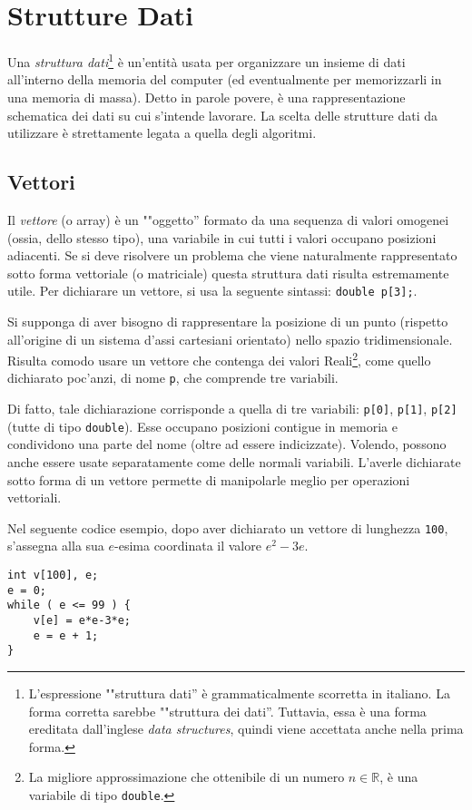 	\section{Strutture Dati}
Una \emph{struttura dati}\footnote{L'espressione ""struttura dati'' è grammaticalmente scorretta in italiano. La forma corretta sarebbe ""struttura dei dati''. Tuttavia, essa è una forma ereditata dall'inglese \emph{data structures}, quindi viene accettata anche nella prima forma.} è un'entità usata per organizzare un insieme di dati all'interno della memoria del computer (ed eventualmente per memorizzarli in una memoria di massa). Detto in parole povere, è una rappresentazione schematica dei dati su cui s'intende lavorare.
La scelta delle strutture dati da utilizzare è strettamente legata a quella degli algoritmi.

		\subsection{Vettori}
		\label{subsec:array}
Il \emph{vettore} (o array) è un ""oggetto'' formato da una sequenza di valori omogenei (ossia, dello stesso tipo), una variabile in cui tutti i valori occupano posizioni adiacenti. Se si deve risolvere un problema che viene naturalmente rappresentato sotto forma vettoriale (o matriciale) questa struttura dati risulta estremamente utile. Per dichiarare un vettore, si usa la seguente sintassi: \lstinline!double p[3];!.

Si supponga di aver bisogno di rappresentare la posizione di un punto (rispetto all'origine di un sistema d'assi cartesiani orientato) nello spazio tridimensionale. Risulta comodo usare un vettore che contenga dei valori Reali\footnote{La migliore approssimazione che ottenibile di un numero $n\in\mathbb{R}$, è una variabile di tipo \lstinline!double!.}, come quello dichiarato poc'anzi, di nome \lstinline!p!, che comprende tre variabili.

Di fatto, tale dichiarazione corrisponde a quella di tre variabili: \lstinline!p[0]!, \lstinline!p[1]!, \lstinline!p[2]! (tutte di tipo \lstinline!double!). Esse occupano posizioni contigue in memoria e condividono una parte del nome (oltre ad essere indicizzate). Volendo, possono anche essere usate separatamente come delle normali variabili. L'averle dichiarate sotto forma di un vettore permette di manipolarle meglio per operazioni vettoriali.

Nel seguente codice esempio, dopo aver dichiarato un vettore di lunghezza \lstinline!100!, s'assegna alla sua $e$-esima coordinata il valore $e^2-3e$.
\begin{lstlisting}
int v[100], e;
e = 0;
while ( e <= 99 ) {
	v[e] = e*e-3*e;
	e = e + 1;
}
\end{lstlisting}

